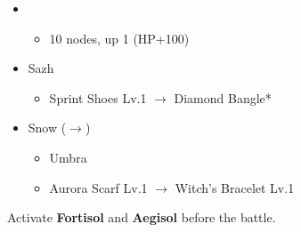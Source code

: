 \begin{menu}
\begin{itemize}
\begin{itemize}
\begin{itemize}
					\item \sab
						\begin{itemize}
							\item 10 nodes, up 1 (HP+100)
						\end{itemize}
				\end{itemize}								
		\end{itemize}
	\equip
		\begin{itemize}
			\item Sazh
				\begin{itemize}
					\item Sprint Shoes Lv.1 $\rightarrow$ Diamond Bangle*
				\end{itemize}
			\item Snow ($\rightarrow$)
				\begin{itemize}
					\item Umbra
					\item Aurora Scarf Lv.1 $\rightarrow$ Witch's Bracelet Lv.1
				\end{itemize}
		\end{itemize}
	\end{itemize}
\end{menu}

\renewcommand{\third}{[3] Consolidation (\sen/\sen/\med)}

Activate \textbf{Fortisol} and \textbf{Aegisol} before the battle.


